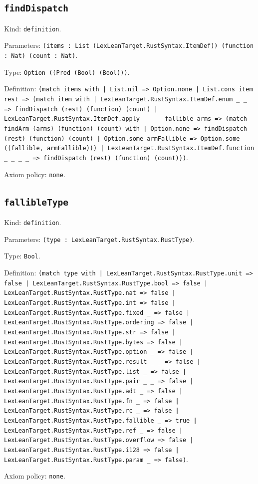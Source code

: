 \documentclass[11pt]{article}
\begin{document}
\subsection*{\texttt{findDispatch}}
\noindent Kind: \texttt{definition}.\par
\noindent Parameters: \texttt{(items : List (LexLeanTarget.RustSyntax.ItemDef)) (function : Nat) (count : Nat)}.\par
\noindent Type: \texttt{Option ((Prod (Bool) (Bool)))}.\par
\noindent Definition: \texttt{(match items with | List.nil => Option.none | List.cons item rest => (match item with | LexLeanTarget.RustSyntax.ItemDef.enum \_ \_ => findDispatch (rest) (function) (count) | LexLeanTarget.RustSyntax.ItemDef.apply \_ \_ \_ fallible arms => (match findArm (arms) (function) (count) with | Option.none => findDispatch (rest) (function) (count) | Option.some armFallible => Option.some ((fallible, armFallible))) | LexLeanTarget.RustSyntax.ItemDef.function \_ \_ \_ \_ => findDispatch (rest) (function) (count)))}.\par
\noindent Axiom policy: \texttt{none}.\par
\subsection*{\texttt{fallibleType}}
\noindent Kind: \texttt{definition}.\par
\noindent Parameters: \texttt{(type : LexLeanTarget.RustSyntax.RustType)}.\par
\noindent Type: \texttt{Bool}.\par
\noindent Definition: \texttt{(match type with | LexLeanTarget.RustSyntax.RustType.unit => false | LexLeanTarget.RustSyntax.RustType.bool => false | LexLeanTarget.RustSyntax.RustType.nat => false | LexLeanTarget.RustSyntax.RustType.int => false | LexLeanTarget.RustSyntax.RustType.fixed \_ => false | LexLeanTarget.RustSyntax.RustType.ordering => false | LexLeanTarget.RustSyntax.RustType.str => false | LexLeanTarget.RustSyntax.RustType.bytes => false | LexLeanTarget.RustSyntax.RustType.option \_ => false | LexLeanTarget.RustSyntax.RustType.result \_ \_ => false | LexLeanTarget.RustSyntax.RustType.list \_ => false | LexLeanTarget.RustSyntax.RustType.pair \_ \_ => false | LexLeanTarget.RustSyntax.RustType.adt \_ => false | LexLeanTarget.RustSyntax.RustType.fn \_ => false | LexLeanTarget.RustSyntax.RustType.rc \_ => false | LexLeanTarget.RustSyntax.RustType.fallible \_ => true | LexLeanTarget.RustSyntax.RustType.ref \_ => false | LexLeanTarget.RustSyntax.RustType.overflow => false | LexLeanTarget.RustSyntax.RustType.i128 => false | LexLeanTarget.RustSyntax.RustType.param \_ => false)}.\par
\noindent Axiom policy: \texttt{none}.\par
\end{document}
